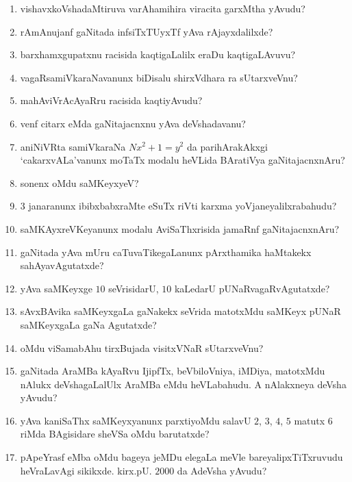 \begin{enumerate}
\item vishavxkoVshadaMtiruva varAhamihira viracita garxMtha yAvudu?
  
\item rAmAnujanf gaNitada infsiTxTUyxTf yAva rAjayxdalilxde?
  
\item barxhamxgupatxnu racisida kaqtigaLalilx eraDu kaqtigaLAvuvu?

\item vagaRsamiVkaraNavanunx biDisalu shirxVdhara ra sUtarxveVnu?

\item mahAviVrAcAyaRru racisida kaqtiyAvudu?
  
\item venf citarx eMda gaNitajacnxnu yAva deVshadavanu?
  
\item aniNiVRta samiVkaraNa $Nx^2 +1 =y^2$ da parihArakAkxgi `cakarxvALa'vanunx moTaTx modalu heVLida BAratiVya gaNitajacnxnAru?
  
\item sonenx oMdu saMKeyxyeV?
  
\item $3$ janaranunx ibibxbabxraMte eSuTx riVti karxma yoVjaneyalilxrabahudu?
  
\item saMKAyxreVKeyanunx modalu AviSaThxrisida jamaRnf gaNitajacnxnAru?
  
\item gaNitada yAva mUru caTuvaTikegaLanunx pArxthamika haMtakekx sahAyavAgutatxde?
  
\item yAva saMKeyxge $10$ seVrisidarU, $10$ kaLedarU pUNaRvagaRvAgutatxde?

\item sAvxBAvika saMKeyxgaLa gaNakekx seVrida matotxMdu saMKeyx pUNaR saMKeyxgaLa gaNa Agutatxde?
  
\item oMdu viSamabAhu tirxBujada visitxVNaR sUtarxveVnu?
  
\item gaNitada AraMBa kAyaRvu IjipfTx, beVbiloVniya, iMDiya, matotxMdu nAlukx deVshagaLalUlx AraMBa eMdu heVLabahudu. A nAlakxneya deVsha yAvudu?
  
\item yAva kaniSaThx saMKeyxyanunx parxtiyoMdu  salavU $2$, $3$, $4$, $5$ matutx $6$ riMda BAgisidare sheVSa oMdu barutatxde?
  
\item pApeYrasf eMba oMdu bageya jeMDu elegaLa meVle bareyalipxTiTxruvudu heVraLavAgi sikikxde. kirx.pU. $2000$ da AdeVsha yAvudu?
  

\end{enumerate}
